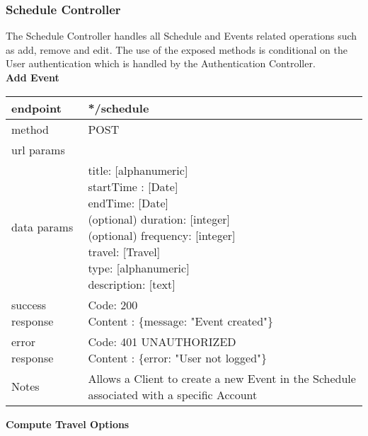 \subsubsection*{Schedule Controller}
The Schedule Controller handles all Schedule and Events related operations such as add, remove and edit. The use of the exposed methods is conditional on the User authentication which is handled by the Authentication Controller.\\

\textbf{Add Event}

\begin{tabularx}{\linewidth}{| l | l |}
	\hline
	endpoint & */schedule \\
	\hline
	method & POST \\
	\hline
	url params & \\
	\hline
	data params &
	\parbox{0.7\textwidth}{
		\bigskip
		title: [alphanumeric]\\
		startTime : [Date]\\
		endTime: [Date] \\
		(optional) duration: [integer]\\
		(optional) frequency: [integer]\\
		travel: [Travel]\\
		type: [alphanumeric]\\
		description: [text]
		\bigskip
	} \\
	\hline
	success response &
	\parbox{0.7\textwidth}{
		\bigskip
		Code: 200\\
		Content : \{message: "Event created"\}
		\bigskip
	} \\
	\hline
	error response &
	\parbox{0.7\textwidth}{
		\bigskip
		Code: 401 UNAUTHORIZED \\
		Content : \{error: "User not logged"\}
		\bigskip
	} \\
	\hline
	Notes & 
	\parbox{0.7\textwidth}{
	\bigskip
	Allows a Client to create a new Event in the Schedule associated with a specific Account
	\bigskip} \\
	\hline
\end{tabularx}
 
\textbf{Compute Travel Options}
 
